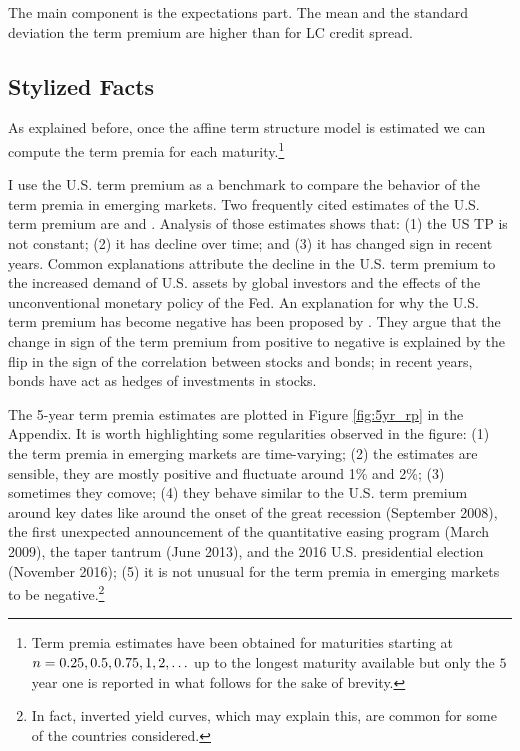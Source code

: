 The main component is the expectations part. The mean and the standard deviation the term premium are higher than for LC credit spread.

\subsection{Stylized Facts}
As explained before, once the affine term structure model is estimated we can compute the term premia for each maturity.\footnote{Term premia estimates have been obtained for maturities starting at $n = 0.25, 0.5, 0.75, 1, 2, \ldots$ up to the longest maturity available but only the $5$ year one is reported in what follows for the sake of brevity.}

I use the U.S. term premium as a benchmark to compare the behavior of the term premia in emerging markets. Two frequently cited estimates of the U.S. term premium are \cite{KimWright:2005} and \cite*{ACM:2013}. Analysis of those estimates shows that: (1) the US TP is not constant; (2) it has decline over time; and (3) it has changed sign in recent years. Common explanations attribute the decline in the U.S. term premium to the increased demand of U.S. assets by global investors and the effects of the unconventional monetary policy of the Fed. An explanation for why the U.S. term premium has become negative has been proposed by \cite*{CampbellSunderamViceira:2017}. They argue that the change in sign of the term premium from positive to negative is explained by the flip in the sign of the correlation between stocks and bonds; in recent years, bonds have act as hedges of investments in stocks.

The 5-year term premia estimates are plotted in Figure \ref{fig:5yr_rp} in the Appendix. It is worth highlighting some regularities observed in the figure: (1) the term premia in emerging markets are time-varying; (2) the estimates are sensible, they are mostly positive and fluctuate around 1\% and 2\%; (3) sometimes they comove; (4) they behave similar to the U.S. term premium around key dates like around the onset of the great recession (September 2008), the first unexpected announcement of the quantitative easing program (March 2009), the taper tantrum (June 2013), and the 2016 U.S. presidential election (November 2016); (5) it is not unusual for the term premia in emerging markets to be negative.\footnote{In fact, inverted yield curves, which may explain this, are common for some of the countries considered.}

